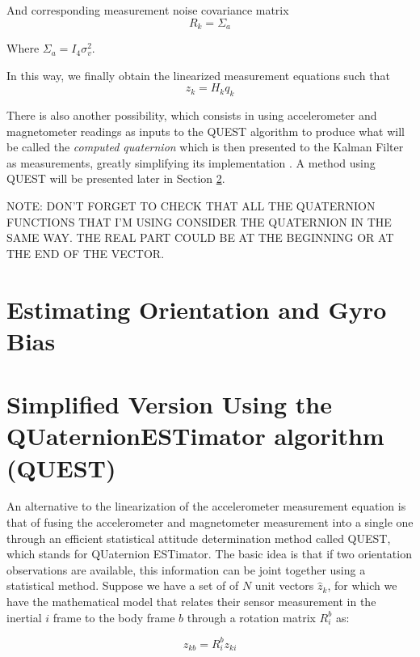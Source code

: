 \documentclass[a4paper,10pt]{article}
\begin{document}
\begin{itemize}
And corresponding measurement noise covariance matrix 
\begin{equation}
 R_k = \Sigma_a
\end{equation}

Where $\Sigma_a = I_4 \sigma_v^2$.

In this way, we finally obtain the linearized measurement equations such that
\begin{equation}
 z_k = H_k q_k 
\end{equation}


There is also another possibility, which consists in using accelerometer and magnetometer readings as inputs to the QUEST \cite{Shuster1981} algorithm to produce what will be called the \emph{computed quaternion} which is then presented to the Kalman Filter as measurements, greatly simplifying its implementation \cite{Shuster1981}. A method using QUEST will be presented later in Section \ref{sect:questSection}. 

NOTE: DON'T FORGET TO CHECK THAT ALL THE QUATERNION FUNCTIONS THAT I'M USING CONSIDER THE QUATERNION IN THE SAME WAY. THE REAL PART COULD BE AT THE BEGINNING OR AT THE END OF THE VECTOR. 


\end{itemize}

\section{Estimating Orientation and Gyro Bias}

\section{Simplified Version Using the QUaternionESTimator algorithm (QUEST)}
\label{sect:questSection}
An alternative to the linearization of the accelerometer measurement equation is that of fusing the accelerometer and magnetometer measurement into a single one through an efficient statistical attitude determination method called QUEST, which stands for QUaternion ESTimator. The basic idea is that if two orientation observations are available, this information can be joint together using a statistical method. Suppose we have a set of of $N$ unit vectors $\hat{z}_k$, for which we have the mathematical model	 that relates their sensor measurement in the inertial ${i}$ frame to the body frame ${b}$ through a rotation matrix $R^b_i$ as:

\begin{equation}
 z_{kb} = R^b_i z_{ki}
\end{equation}
\end{document}
